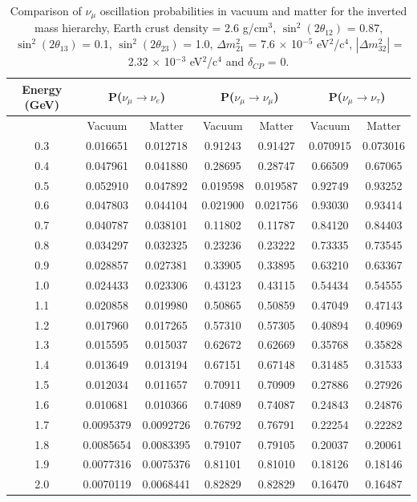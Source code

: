 \begin{table}
\centering
\begin{tabular}{| c | c | c | c | c | c | c |}
\hline
Energy (GeV) & \multicolumn{2}{|c|}{P($\nu_{\mu} \rightarrow \nu_{e}$)} & \multicolumn{2}{|c|}{P($\nu_{\mu} \rightarrow \nu_{\mu}$)} & \multicolumn{2}{|c|}{P($\nu_{\mu} \rightarrow \nu_{\tau}$)}\\
\hline
 & Vacuum & Matter & Vacuum & Matter & Vacuum & Matter \\
\hline
0.3 &  0.016651 &  0.012718 &  0.91243 &  0.91427 &  0.070915 &  0.073016\\
\hline
0.4 &  0.047961 &  0.041880 &  0.28695 &  0.28747 &  0.66509 &  0.67065\\
\hline
0.5 &   0.052910 &  0.047892 &  0.019598 &   0.019587 &  0.92749 &  0.93252\\
\hline
0.6 &  0.047803 &  0.044104 &  0.021900 &  0.021756 &  0.93030 &  0.93414\\
\hline
0.7 &  0.040787 &  0.038101 &  0.11802 &   0.11787 &  0.84120 &  0.84403\\
\hline
0.8 &  0.034297 &  0.032325 &  0.23236 &  0.23222 &  0.73335 &  0.73545\\
\hline
0.9 &  0.028857 &  0.027381 &  0.33905 &  0.33895 &  0.63210 &  0.63367\\
\hline
1.0 &  0.024433 &  0.023306 &  0.43123 &  0.43115 &  0.54434 &  0.54555\\
\hline
1.1 &  0.020858 &  0.019980 &  0.50865 &  0.50859 &  0.47049 &  0.47143\\
\hline
1.2 &  0.017960 &  0.017265 &  0.57310 &  0.57305 &  0.40894 &  0.40969\\
\hline
1.3 &  0.015595 &  0.015037 &  0.62672 &  0.62669 &  0.35768 &  0.35828\\
\hline
1.4 &  0.013649 &  0.013194 &  0.67151 &  0.67148 &  0.31485 &  0.31533\\
\hline
1.5 &  0.012034 &  0.011657 &  0.70911 &  0.70909 &  0.27886 &  0.27926\\
\hline
1.6 &  0.010681 &  0.010366 &  0.74089 &  0.74087 &  0.24843 &  0.24876\\
\hline
1.7 &  0.0095379 &  0.0092726 &  0.76792 & 0.76791 &  0.22254 &  0.22282\\
\hline
1.8 &  0.0085654 &  0.0083395 &  0.79107 &  0.79105 &  0.20037 &  0.20061\\
\hline
1.9 &   0.0077316 &  0.0075376 &  0.81101 &  0.81010 &  0.18126 &  0.18146\\
\hline
2.0 &  0.0070119 &  0.0068441 &  0.82829 &  0.82829 &  0.16470 &  0.16487\\
\hline
\end{tabular}
\caption
{
  Comparison of $\nu_{\mu}$ oscillation probabilities in vacuum and matter for the inverted mass hierarchy, Earth crust
  density = 2.6 g/cm$^{3}$, $ \sin^{2}(2 \theta_{12})$ = 0.87, $\sin^{2}(2 \theta_{13})$ = 0.1, $\sin^{2}(2 \theta_{23})$ = 1.0,
  $\Delta m_{21}^{2}$ = 7.6 $\times$ 10$^{-5}$ eV$^{2}$/c$^{4}$, $|\Delta m_{32}^{2}|$ = 2.32 $\times$ 10$^{-3}$ eV$^{2}$/c$^{4}$ and $\delta_{CP}$ = 0.
}
\label{numuOscMatterEffectsIH}
\end{table}

